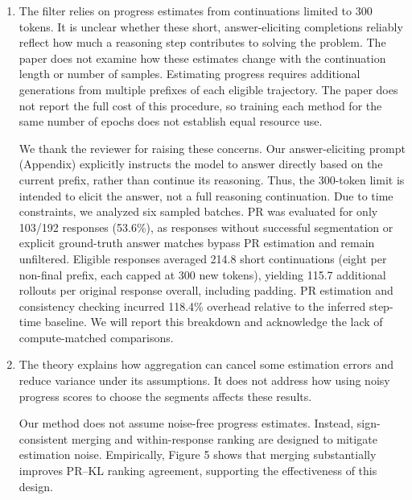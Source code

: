\documentclass[11pt,a4paper]{article}
\begin{document}
\begin{enumerate}
\item The filter relies on progress estimates from continuations limited to 300 tokens. It is unclear whether these short, answer-eliciting completions reliably reflect how much a reasoning step contributes to solving the problem. The paper does not examine how these estimates change with the continuation length or number of samples. Estimating progress requires additional generations from multiple prefixes of each eligible trajectory. The paper does not report the full cost of this procedure, so training each method for the same number of epochs does not establish equal resource use.
\par{}
\begin{responsebox}[frametitle={Response to W3}]
We thank the reviewer for raising these concerns. Our answer-eliciting prompt (Appendix) explicitly instructs the model to answer directly based on the current prefix, rather than continue its reasoning. Thus, the 300-token limit is intended to elicit the answer, not a full reasoning continuation. Due to time constraints, we analyzed six sampled batches. PR was evaluated for only 103/192 responses (53.6\%), as responses without successful segmentation or explicit ground-truth answer matches bypass PR estimation and remain unfiltered. Eligible responses averaged 214.8 short continuations (eight per non-final prefix, each capped at 300 new tokens), yielding 115.7 additional rollouts per original response overall, including padding. PR estimation and consistency checking incurred 118.4\% overhead relative to the inferred step-time baseline. We will report this breakdown and acknowledge the lack of compute-matched comparisons.
\end{responsebox}

\item The theory explains how aggregation can cancel some estimation errors and reduce variance under its assumptions. It does not address how using noisy progress scores to choose the segments affects these results.
\par{}
\begin{responsebox}[frametitle={Response to W4}]
Our method does not assume noise-free progress estimates. Instead, sign-consistent merging and within-response ranking are designed to mitigate estimation noise. Empirically, Figure 5 shows that merging substantially improves PR--KL ranking agreement, supporting the effectiveness of this design.
\end{responsebox}


\end{enumerate}
\end{document}
